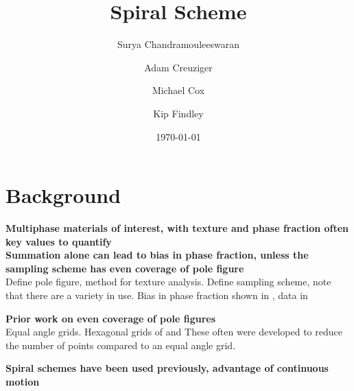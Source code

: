 \documentclass{article}
\begin{document}
\title{Spiral Scheme} %
\date{\today}
\author[1, 2]{Surya Chandramouleeswaran}
\author[3]{Adam Creuziger}
\author[2]{Michael Cox}
\author[2]{Kip Findley}



\maketitle



\section{Background}


\textbf{Multiphase materials of interest, with texture and phase fraction often key values to quantify}\\

\textbf{Summation alone can lead to bias in phase fraction, unless the sampling scheme has even coverage of pole figure}\\
Define pole figure, method for texture analysis.
Define sampling scheme, note that there are a variety in use. %
Bias in phase fraction shown in \citep{creuziger_assessment_2018}, data in \cite{creuziger_dataset:_2018}

\textbf{Prior work on even coverage of pole figures}\\
Equal angle grids. %
Hexagonal grids of \citep{matthies_optimization_1992} and \citep{rizzie_elaboration_2008}
These often were developed to reduce the number of points compared to an equal angle grid.

\textbf{Spiral schemes have been used previously, advantage of continuous motion}\\
\end{document}
